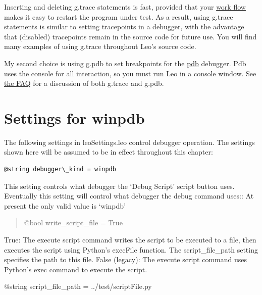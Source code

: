 \documentclass[a4paper,10pt,english]{sphinxmanual}
\begin{document}
Inserting and deleting g.trace statements is fast, provided that your \href{http://webpages.charter.net/edreamleo/FAQ.html\#how-can-i-use-leo-to-develop-leo-itself}{work
flow} makes it easy to restart the program under test. As a result, using
g.trace statements is similar to setting tracepoints in a debugger, with the
advantage that (disabled) tracepoints remain in the source code for future use.
You will find many examples of using g.trace throughout Leo's source code.

My second choice is using g.pdb to set breakpoints for the \href{http://docs.python.org/lib/module-pdb.html}{pdb} debugger. Pdb
uses the console for all interaction, so you must run Leo in a console window.
See \href{http://webpages.charter.net/edreamleo/FAQ.html\#how-can-i-use-python-s-pdb-debugger-with-leo}{the FAQ} for a discussion of both g.trace and g.pdb.


\section{Settings for winpdb}
\label{debuggers:settings-for-winpdb}
The following settings in leoSettings.leo control debugger operation.
The settings shown here will be assumed to be in effect throughout this chapter:

\begin{Verbatim}[commandchars=\\\{\}]
@string debugger\_kind = winpdb
\end{Verbatim}

This setting controls what debugger the `Debug Script' script button uses.
Eventually this setting will control what debugger the debug command uses::
At present the only valid value is `winpdb'
\begin{quote}

@bool write\_script\_file = True
\end{quote}

True: The execute script command writes the script to be executed to a file,
then executes the script using Python's execFile function. The script\_file\_path
setting specifies the path to this file. False (legacy): The execute script
command uses Python's exec command to execute the script.

@string script\_file\_path = ../test/scriptFile.py
\end{document}
